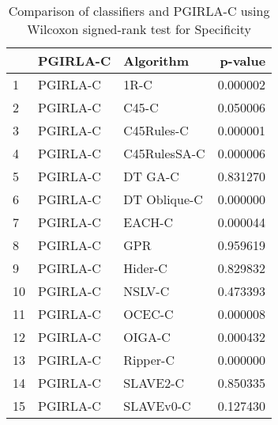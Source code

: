\begin{table}
\footnotesize
\caption{Comparison of classifiers and PGIRLA-C using Wilcoxon signed-rank test for Specificity}
\label{tab:PGIRLA-C wilcoxon Specificity comparison}
\begin{tabular}{lllr}
\hline
 & PGIRLA-C & Algorithm & p-value \\
\hline
1 & PGIRLA-C & 1R-C & 0.000002 \\
2 & PGIRLA-C & C45-C & 0.050006 \\
3 & PGIRLA-C & C45Rules-C & 0.000001 \\
4 & PGIRLA-C & C45RulesSA-C & 0.000006 \\
5 & PGIRLA-C & DT GA-C & 0.831270 \\
6 & PGIRLA-C & DT Oblique-C & 0.000000 \\
7 & PGIRLA-C & EACH-C & 0.000044 \\
8 & PGIRLA-C & GPR & 0.959619 \\
9 & PGIRLA-C & Hider-C & 0.829832 \\
10 & PGIRLA-C & NSLV-C & 0.473393 \\
11 & PGIRLA-C & OCEC-C & 0.000008 \\
12 & PGIRLA-C & OIGA-C & 0.000432 \\
13 & PGIRLA-C & Ripper-C & 0.000000 \\
14 & PGIRLA-C & SLAVE2-C & 0.850335 \\
15 & PGIRLA-C & SLAVEv0-C & 0.127430 \\
\hline
\end{tabular}
\end{table}
